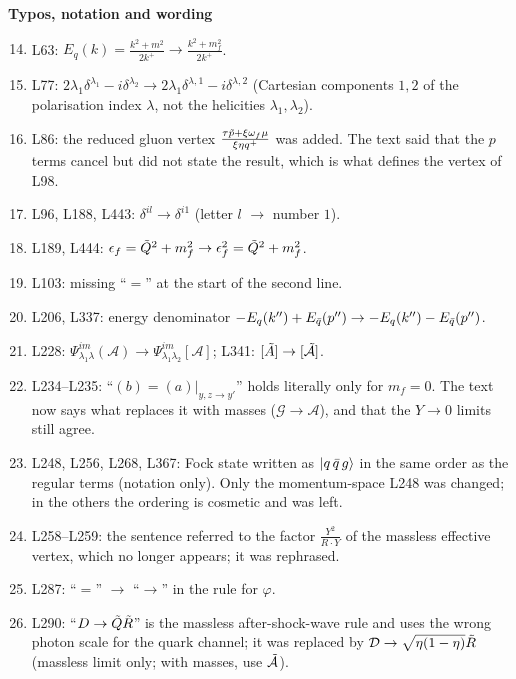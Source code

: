 \documentclass[9pt]{article}
\numberwithin{equation}{section}
\begin{document}
\noindent\textbf{Typos, notation and wording}
\begin{enumerate}\setcounter{enumi}{13}
    \item L63: $E_{q}(k)=\frac{k^{2}+m^{2}}{2k^{+}}\rightarrow\frac{k^{2}+m^{2}_{f}}{2k^{+}}$.
    \item L77: $2\lambda_{1}\delta^{\lambda_{1}}-i\delta^{\lambda_{2}}\rightarrow 2\lambda_{1}\delta^{\lambda,1}-i\delta^{\lambda,2}$ (Cartesian components $1,2$ of the polarisation index $\lambda$, not the helicities $\lambda_{1},\lambda_{2}$).
    \item L86: the reduced gluon vertex $\frac{\tau\Tilde{p}+\xi\omega_{f}\mu}{\xi\eta q^{+}}$ was added. The text said that the $p$ terms cancel but did not state the result, which is what defines the vertex of L98.
    \item L96, L188, L443: $\delta^{il}\rightarrow\delta^{i1}$ (letter $l$ $\rightarrow$ number $1$).
    \item L189, L444: $\epsilon_{f}=\Tilde{Q}^{2}+m^{2}_{f}\rightarrow\epsilon^{2}_{f}=\Tilde{Q}^{2}+m^{2}_{f}$.
    \item L103: missing ``$=$'' at the start of the second line.
    \item L206, L337: energy denominator $-E_{q}(k'')+E_{\Bar{q}}(p'')\rightarrow-E_{q}(k'')-E_{\Bar{q}}(p'')$.
    \item L228: $\Psi^{im}_{\lambda_{1}\lambda}(\mathcal{A})\rightarrow\Psi^{im}_{\lambda_{1}\lambda_{2}}[\mathcal{A}]$; L341: $[\Tilde{A}]\rightarrow[\Tilde{\mathcal{A}}]$.
    \item L234--L235: ``$(b)=(a)|_{y,z\rightarrow y'}$'' holds literally only for $m_{f}=0$. The text now says what replaces it with masses ($\mathcal{G}\rightarrow\mathcal{A}$), and that the $Y\rightarrow 0$ limits still agree.
    \item L248, L256, L268, L367: Fock state written as $\ket{q\,\Bar{q}\,g}$ in the same order as the regular terms (notation only). Only the momentum-space L248 was changed; in the others the ordering is cosmetic and was left.
    \item L258--L259: the sentence referred to the factor $\frac{Y^{2}}{R\cdot Y}$ of the massless effective vertex, which no longer appears; it was rephrased.
    \item L287: ``$=$'' $\rightarrow$ ``$\rightarrow$'' in the rule for $\varphi$.
    \item L290: ``$D\rightarrow\Tilde{Q}\Tilde{R}$'' is the massless after-shock-wave rule and uses the wrong photon scale for the quark channel; it was replaced by $\mathcal{D}\rightarrow\sqrt{\eta(1-\eta)}\Tilde{R}$ (massless limit only; with masses, use $\Tilde{\mathcal{A}}$).

\end{enumerate}
\end{document}
